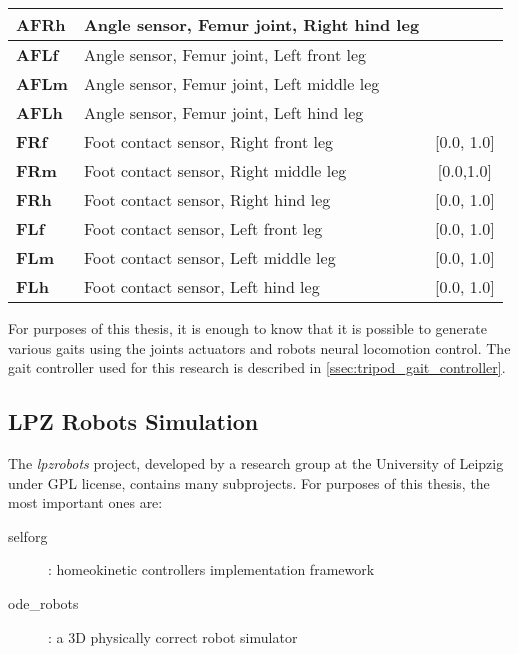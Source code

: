\begin{table}[H]
\begin{tabular}{|l|l|c|}
\textbf{AFRh}         & Angle sensor, Femur joint, Right hind leg        &                         \\ \hline
\textbf{AFLf}         & Angle sensor, Femur joint, Left front leg        &                         \\ \hline
\textbf{AFLm}         & Angle sensor, Femur joint, Left middle leg       &                         \\ \hline
\textbf{AFLh}         & Angle sensor, Femur joint, Left hind leg         &                         \\ \hline
\textbf{FRf}          & Foot contact sensor, Right front leg             & {[}0.0, 1.0{]}          \\ \hline
\textbf{FRm}          & Foot contact sensor, Right middle leg            & {[}0.0,1.0{]}           \\ \hline
\textbf{FRh}          & Foot contact sensor, Right hind leg              & {[}0.0, 1.0{]}          \\ \hline
\textbf{FLf}          & Foot contact sensor, Left front leg              & {[}0.0, 1.0{]}          \\ \hline
\textbf{FLm}          & Foot contact sensor, Left middle leg             & {[}0.0, 1.0{]}          \\ \hline
\textbf{FLh}          & Foot contact sensor, Left hind leg               & {[}0.0, 1.0{]}          \\ \hline
\end{tabular}
\end{table}

For purposes of this thesis, it is enough to know that it is possible to generate various gaits using the joints actuators and robots neural locomotion control. The gait controller used for this research is described in \cref{ssec:tripod_gait_controller}.

\subsection{LPZ Robots Simulation} \label{ssec:lpzrobots_sim}
The \textit{lpzrobots} project, developed by a research group at the University of Leipzig \citep{misc:lpzrobots} under GPL license, contains many subprojects. For purposes of this thesis, the most important ones are:

\begin{description}
\item[selforg] : homeokinetic controllers implementation framework
\item[ode\_robots] : a 3D physically correct robot simulator
\end{description}

